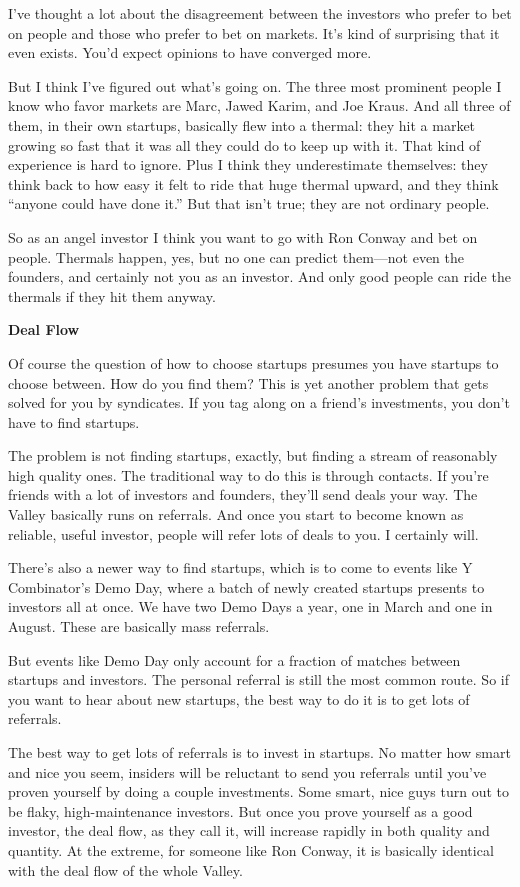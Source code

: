 I've thought a lot about the disagreement between the investors who
prefer to bet on people and those who prefer to bet on markets. It's
kind of surprising that it even exists. You'd expect opinions to have
converged more.

But I think I've figured out what's going on. The three most prominent
people I know who favor markets are Marc, Jawed Karim, and Joe Kraus.
And all three of them, in their own startups, basically flew into a
thermal: they hit a market growing so fast that it was all they could do
to keep up with it. That kind of experience is hard to ignore. Plus I
think they underestimate themselves: they think back to how easy it felt
to ride that huge thermal upward, and they think ``anyone could have
done it.'' But that isn't true; they are not ordinary people.

So as an angel investor I think you want to go with Ron Conway and bet
on people. Thermals happen, yes, but no one can predict them---not even
the founders, and certainly not you as an investor. And only good people
can ride the thermals if they hit them anyway.

\textbf{Deal Flow}

Of course the question of how to choose startups presumes you have
startups to choose between. How do you find them? This is yet another
problem that gets solved for you by syndicates. If you tag along on a
friend's investments, you don't have to find startups.

The problem is not finding startups, exactly, but finding a stream of
reasonably high quality ones. The traditional way to do this is through
contacts. If you're friends with a lot of investors and founders,
they'll send deals your way. The Valley basically runs on referrals. And
once you start to become known as reliable, useful investor, people will
refer lots of deals to you. I certainly will.

There's also a newer way to find startups, which is to come to events
like Y Combinator's Demo Day, where a batch of newly created startups
presents to investors all at once. We have two Demo Days a year, one in
March and one in August. These are basically mass referrals.

But events like Demo Day only account for a fraction of matches between
startups and investors. The personal referral is still the most common
route. So if you want to hear about new startups, the best way to do it
is to get lots of referrals.

The best way to get lots of referrals is to invest in startups. No
matter how smart and nice you seem, insiders will be reluctant to send
you referrals until you've proven yourself by doing a couple
investments. Some smart, nice guys turn out to be flaky,
high-maintenance investors. But once you prove yourself as a good
investor, the deal flow, as they call it, will increase rapidly in both
quality and quantity. At the extreme, for someone like Ron Conway, it is
basically identical with the deal flow of the whole Valley.

